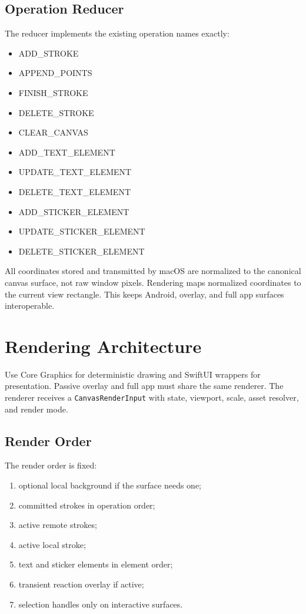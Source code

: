 \documentclass[11pt]{article}
\begin{document}
\subsection{Operation Reducer}

The reducer implements the existing operation names exactly:
\begin{itemize}
  \item ADD\_STROKE
  \item APPEND\_POINTS
  \item FINISH\_STROKE
  \item DELETE\_STROKE
  \item CLEAR\_CANVAS
  \item ADD\_TEXT\_ELEMENT
  \item UPDATE\_TEXT\_ELEMENT
  \item DELETE\_TEXT\_ELEMENT
  \item ADD\_STICKER\_ELEMENT
  \item UPDATE\_STICKER\_ELEMENT
  \item DELETE\_STICKER\_ELEMENT
\end{itemize}

All coordinates stored and transmitted by macOS are normalized to the canonical canvas surface, not raw window pixels. Rendering maps normalized coordinates to the current view rectangle. This keeps Android, overlay, and full app surfaces interoperable.

\section{Rendering Architecture}

Use Core Graphics for deterministic drawing and SwiftUI wrappers for presentation. Passive overlay and full app must share the same renderer. The renderer receives a \texttt{CanvasRenderInput} with state, viewport, scale, asset resolver, and render mode.

\subsection{Render Order}

The render order is fixed:
\begin{enumerate}
  \item optional local background if the surface needs one;
  \item committed strokes in operation order;
  \item active remote strokes;
  \item active local stroke;
  \item text and sticker elements in element order;
  \item transient reaction overlay if active;
  \item selection handles only on interactive surfaces.
\end{enumerate}
\end{document}
